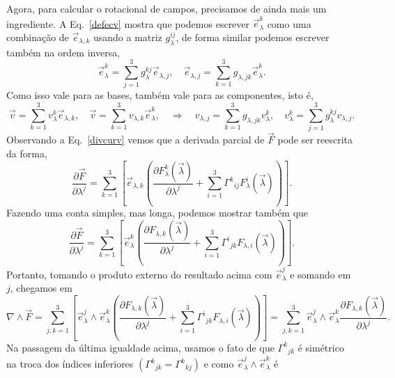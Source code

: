 Agora, para calcular o rotacional de campos, precisamos de ainda mais um
ingrediente. A Eq.~\eqref{defecv} mostra que podemos escrever
$\vec{e}_\lambda^k$ como uma combinação de $\vec{e}_{\lambda,k}$ usando a matriz
$g_\lambda^{ij}$, de forma similar podemos escrever também na ordem inversa,
\begin{equation}
	\vec{e}_\lambda^k = \sum_{j=1}^3 g_\lambda^{kj}\vec{e}_{\lambda,j},  \quad \vec{e}_{\lambda,j} = \sum_{k=1}^3 g_{\lambda,jk}\vec{e}_\lambda^k.
\end{equation}
Como isso vale para as bases, também vale para as componentes, isto é,
\begin{equation}
	\vec{v} = \sum_{k=1}^3v_\lambda^k\vec{e}_{\lambda,k}, \quad \vec{v} = \sum_{k=1}^3v_{\lambda,k}\vec{e}_{\lambda}^k, \quad\Rightarrow\quad v_{\lambda,j} = \sum_{k=1}^3 g_{\lambda,jk}v_\lambda^k,\quad v_\lambda^k = \sum_{j=1}^3 g_\lambda^{kj}v_{\lambda,j}.
\end{equation}
Observando a Eq.~\eqref{divcurv} vemos que a derivada parcial de $\vec{F}$ pode
ser reescrita da forma,
\begin{equation}
	\frac{\partial\vec{F}}{\partial\lambda^j} = \sum_{k=1}^3\left[\vec{e}_{\lambda,k}\left(\frac{\partial F_\lambda^k(\vec{\lambda})}{\partial \lambda^j}+\sum_{i=1}^3\Gamma^{k}{}_{ij}F_\lambda^i(\vec{\lambda})\right)\right].
\end{equation}
Fazendo uma conta simples, mas longa, podemos mostrar também que
\begin{equation}
	\frac{\partial\vec{F}}{\partial\lambda^j} = \sum_{k=1}^3\left[\vec{e}_{\lambda}^k\left(\frac{\partial F_{\lambda,k}(\vec{\lambda})}{\partial \lambda^j}+\sum_{i=1}^3\Gamma^{i}{}_{jk}F_{\lambda,i}(\vec{\lambda})\right)\right].
\end{equation}
Portanto, tomando o produto externo do resultado acima com $\vec{e}_\lambda^j$ e somando em $j$, chegamos em
\begin{equation}
	\nabla\wedge\vec{F} = \sum_{j,k=1}^3\left[\vec{e}_\lambda^j\wedge\vec{e}_{\lambda}^k\left(\frac{\partial F_{\lambda,k}(\vec{\lambda})}{\partial \lambda^j}+\sum_{i=1}^3\Gamma^{i}{}_{jk}F_{\lambda,i}(\vec{\lambda})\right)\right] = \sum_{j,k=1}^3\vec{e}_\lambda^j\wedge\vec{e}_{\lambda}^k\frac{\partial F_{\lambda,k}(\vec{\lambda})}{\partial \lambda^j}.
\end{equation}
Na passagem da última igualdade acima, usamos o fato de que $\Gamma^{k}{}_{jk}$
é simétrico na troca dos índices inferiores $(\Gamma^{k}{}_{jk} =
	\Gamma^{k}{}_{kj})$ e como $\vec{e}_\lambda^j\wedge\vec{e}_{\lambda}^k$ é
